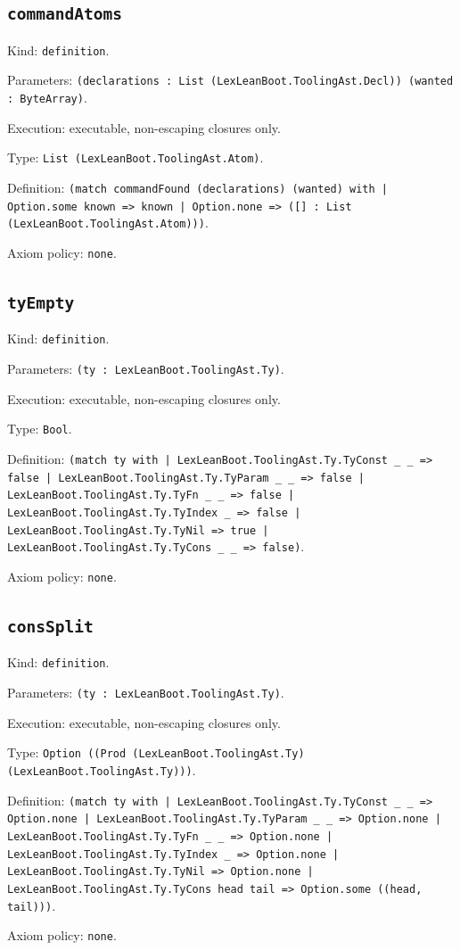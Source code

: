 \documentclass[11pt]{article}
\begin{document}
\subsection*{\texttt{commandAtoms}}
\noindent Kind: \texttt{definition}.\par
\noindent Parameters: \texttt{(declarations : List (LexLeanBoot.ToolingAst.Decl)) (wanted : ByteArray)}.\par
\noindent Execution: executable, non-escaping closures only.\par
\noindent Type: \texttt{List (LexLeanBoot.ToolingAst.Atom)}.\par
\noindent Definition: \texttt{(match commandFound (declarations) (wanted) with | Option.some known => known | Option.none => ([] : List (LexLeanBoot.ToolingAst.Atom)))}.\par
\noindent Axiom policy: \texttt{none}.\par
\subsection*{\texttt{tyEmpty}}
\noindent Kind: \texttt{definition}.\par
\noindent Parameters: \texttt{(ty : LexLeanBoot.ToolingAst.Ty)}.\par
\noindent Execution: executable, non-escaping closures only.\par
\noindent Type: \texttt{Bool}.\par
\noindent Definition: \texttt{(match ty with | LexLeanBoot.ToolingAst.Ty.TyConst \_ \_ => false | LexLeanBoot.ToolingAst.Ty.TyParam \_ \_ => false | LexLeanBoot.ToolingAst.Ty.TyFn \_ \_ => false | LexLeanBoot.ToolingAst.Ty.TyIndex \_ => false | LexLeanBoot.ToolingAst.Ty.TyNil => true | LexLeanBoot.ToolingAst.Ty.TyCons \_ \_ => false)}.\par
\noindent Axiom policy: \texttt{none}.\par
\subsection*{\texttt{consSplit}}
\noindent Kind: \texttt{definition}.\par
\noindent Parameters: \texttt{(ty : LexLeanBoot.ToolingAst.Ty)}.\par
\noindent Execution: executable, non-escaping closures only.\par
\noindent Type: \texttt{Option ((Prod (LexLeanBoot.ToolingAst.Ty) (LexLeanBoot.ToolingAst.Ty)))}.\par
\noindent Definition: \texttt{(match ty with | LexLeanBoot.ToolingAst.Ty.TyConst \_ \_ => Option.none | LexLeanBoot.ToolingAst.Ty.TyParam \_ \_ => Option.none | LexLeanBoot.ToolingAst.Ty.TyFn \_ \_ => Option.none | LexLeanBoot.ToolingAst.Ty.TyIndex \_ => Option.none | LexLeanBoot.ToolingAst.Ty.TyNil => Option.none | LexLeanBoot.ToolingAst.Ty.TyCons head tail => Option.some ((head, tail)))}.\par
\noindent Axiom policy: \texttt{none}.\par
\end{document}
